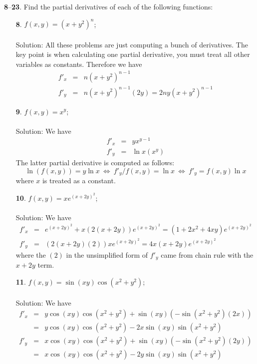 \documentclass[12pt]{amsbook}
\begin{document}
\noindent
{\small {\bf 8}--{\bf 23}}. Find the partial derivatives of each of the following functions:
\begin{enumerate}
\item[{\small\bf 8}.] $f(x,y)=(x+y^2)^n$;
\\
\\
{\sc Solution}: All these problems are just computing a bunch of derivatives. The key point is when calculating one partial derivative, you must treat all other variables as constants. Therefore we have
\begin{eqnarray*}
f'_x&=&n(x+y^2)^{n-1}\\
f'_y&=&n(x+y^2)^{n-1}(2y)=2ny(x+y^2)^{n-1}
\end{eqnarray*}
\item[{\small\bf 9}.] $f(x,y)=x^y$;
\\
\\
{\sc Solution}: We have
\begin{eqnarray*}
f'_x&=&yx^{y-1}\\
f'_y&=&\ln x (x^y)
\end{eqnarray*}
The latter partial derivative is computed as follows:
$$\ln(f(x,y))=y\ln x  \ \Leftrightarrow \ f'_y/f(x,y)=\ln x \ \Leftrightarrow \ f'_y=f(x,y)\ln x$$
where $x$ is treated as a constant.
\\
\item[{\small\bf 10}.] $f(x,y)=xe^{(x+2y)^2}$;
\\
\\
{\sc Solution}: We have
\begin{eqnarray*}
f'_x&=&e^{(x+2y)^2}+x(2(x+2y))e^{(x+2y)^2}=(1+2x^2+4xy)e^{(x+2y)^2} \\
f'_y&=&(2(x+2y)(2))xe^{(x+2y)^2}=4x(x+2y)e^{(x+2y)^2}
\end{eqnarray*}
where the $(2)$ in the unsimplified form of $f'_y$ came from chain rule with the $x+2y$ term. 
\\
\item[{\small\bf 11}.] $f(x,y)=\sin(xy)\cos(x^2+y^2)$;
\\
\\
{\sc Solution}: We have
\begin{eqnarray*}
f'_x&=&y\cos(xy)\cos(x^2+y^2)+\sin(xy)(-\sin(x^2+y^2)(2x))\\
&=&y\cos(xy)\cos(x^2+y^2)-2x\sin(xy)\sin(x^2+y^2) \\
f'_y&=&x\cos(xy)\cos(x^2+y^2)+\sin(xy)(-\sin(x^2+y^2)(2y))\\
&=&x\cos(xy)\cos(x^2+y^2)-2y\sin(xy)\sin(x^2+y^2)
\end{eqnarray*}

\end{enumerate}
\end{document}
